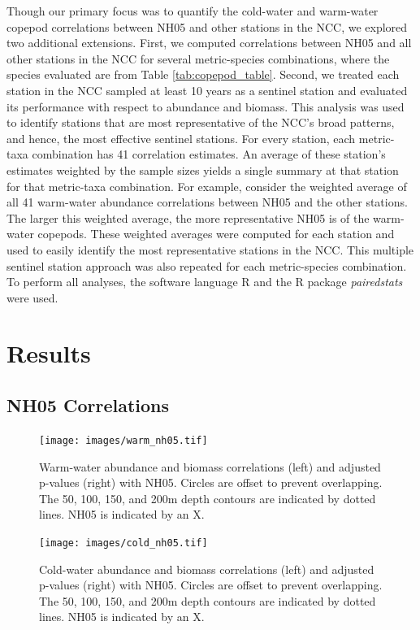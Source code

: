 \documentclass[preprint, authoryear, 12pt]{elsarticle}
\begin{document}
Though our primary focus was to quantify the cold-water and warm-water copepod correlations between NH05 and other stations in the NCC, we explored two additional extensions.  First, we computed correlations between NH05 and all other stations in the NCC for several metric-species combinations, where the species evaluated are from Table \ref{tab:copepod_table}. Second, we treated each station in the NCC sampled at least 10 years as a sentinel station and evaluated its performance with respect to abundance and biomass. This analysis was used to identify stations that are most representative of the NCC's broad patterns, and hence, the most effective sentinel stations. For every station, each metric-taxa combination has 41 correlation estimates. An average of these station’s estimates weighted by the sample sizes yields a single summary at that station for that metric-taxa combination.  For example, consider the weighted average of all 41 warm-water abundance correlations between NH05 and the other stations. The larger this weighted average, the more representative NH05 is of the warm-water copepods. These weighted averages were computed for each station and used to easily identify the most representative stations in the NCC. This multiple sentinel station approach was also repeated for each metric-species combination. To perform all analyses, the software language R \citep{rcore2019r} and the R package \textit{pairedstats} \citep{dumelle2021pairedstats} were used. 

\section{Results}

\subsection{NH05 Correlations}\label{subsec:nh05_cors}


\begin{figure}
  \centering
  \texttt{[image: images/warm\_nh05.tif]}
  \caption{Warm-water abundance and biomass correlations (left) and adjusted p-values (right) with NH05.  Circles are offset to prevent overlapping. The 50, 100, 150, and 200m depth contours are indicated by dotted lines.  NH05 is indicated by an X. }
  \label{fig:warm_nh05}
  \texttt{[image: images/cold\_nh05.tif]}
  \caption{Cold-water abundance and biomass correlations (left) and adjusted p-values (right) with NH05.  Circles are offset to prevent overlapping. The 50, 100, 150, and 200m depth contours are indicated by dotted lines.  NH05 is indicated by an X. }
  \label{fig:cold_nh05}
\end{figure}
\end{document}
